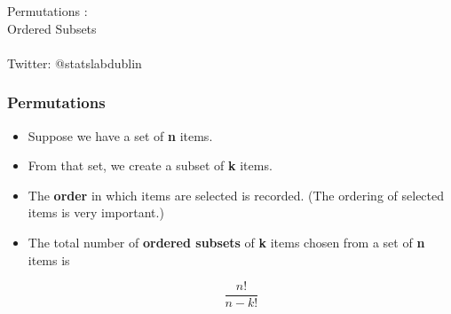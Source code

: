 \documentclass{beamer}
\begin{document}
\begin{frame}



\begin{center}
{\Huge Permutations : }\\\vspace{0.3cm} {\Huge  Ordered Subsets} \\\\ \vspace{0.4cm}
{\Large Twitter: @statslabdublin}
\end{center}


\end{frame}
\begin{frame}

\frametitle{Permutations}
{\Large
\begin{itemize}

\item Suppose we have a set of \textbf{n} items.
\item From that set, we create a subset of \textbf{k} items.
\item The \textbf{order} in which items are selected is recorded. (The ordering of selected items is very important.) 
\item The total number of \textbf{ordered subsets} of \textbf{k} items chosen from a set of \textbf{n} items is

\[\frac{n!}{n-k!}\]
\end{itemize}
}
\end{frame}
\end{document}
